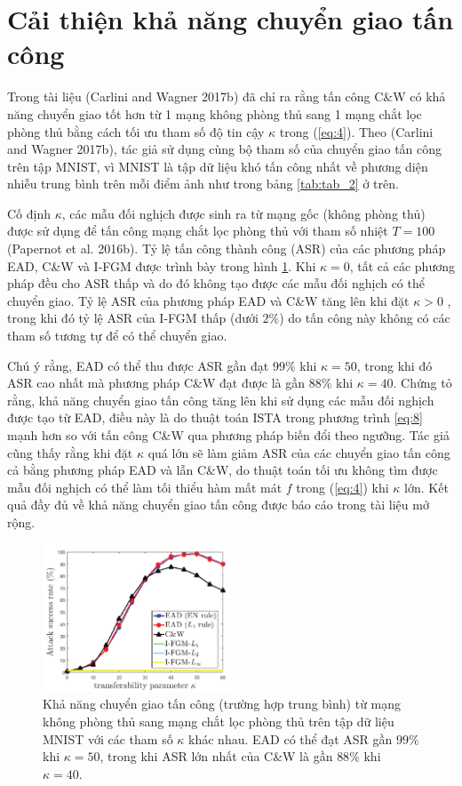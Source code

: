 \section{Cải thiện khả năng chuyển giao tấn công}
Trong tài liệu (Carlini and Wagner 2017b) đã chỉ ra rằng tấn công C\&W có khả năng chuyển giao tốt hơn  từ 1 mạng không phòng thủ sang 1 mạng chắt lọc phòng thủ bằng cách tối ưu tham số độ tin cậy $\kappa$ trong (\ref{eq:4}). Theo (Carlini and Wagner 2017b), tác giả sử dụng cùng bộ tham số của chuyển giao tấn công trên tập MNIST, vì MNIST là tập dữ liệu khó tấn công nhất về phương diện nhiễu trung bình trên mỗi điểm ảnh như trong bảng \ref{tab:tab_2} ở trên.

Cố định $\kappa$, các mẫu đối nghịch được sinh ra từ mạng gốc (không phòng thủ) được sử dụng để tấn công mạng chắt lọc phòng thủ với tham số nhiệt $T = 100$ (Papernot et al. 2016b). Tỷ lệ tấn công thành công (ASR) của các phương pháp EAD, C\&W và I-FGM được trình bày trong hình \ref{fig:fg_04}. Khi $\kappa = 0$, tất cả các phương pháp đều cho ASR thấp và do đó không tạo được các mẫu đối nghịch có thể chuyển giao. Tỷ lệ ASR của phương pháp EAD và C\&W tăng lên khi đặt $\kappa > 0$ , trong khi đó tỷ lệ ASR của I-FGM thấp (dưới $2\%$) do tấn công này không có các tham số tương tự để có thể chuyển giao.

Chú ý rằng, EAD có thể thu được ASR gần đạt $99\%$ khi $\kappa = 50$, trong khi đó ASR cao nhất mà phương pháp C\&W đạt được là gần $88\%$ khi $\kappa = 40$. Chứng tỏ rằng, khả năng chuyển giao tấn công tăng lên khi sử dụng các mẫu đối nghịch được tạo từ EAD, điều này là do thuật toán ISTA trong phương trình \ref{eq:8} mạnh hơn so với tấn công C\&W qua phương pháp biến đổi theo ngưỡng. Tác giả cũng thấy rằng khi đặt $\kappa$ quá lớn sẽ làm giảm ASR của các chuyển giao tấn công cả bằng phương pháp EAD và lẫn C\&W, do thuật toán tối ưu không tìm được mẫu đối nghịch có thể làm tối thiểu hàm mất mát $f$ trong (\ref{eq:4}) khi $\kappa$ lớn. Kết quả đầy đủ về khả năng chuyển giao tấn công được báo cáo trong tài liệu mở rộng.

\begin{figure}[H] %
    \centering %
    \includegraphics[width=0.5\textwidth]{assets/fig_04.png} 
    \caption{Khả năng chuyển giao tấn công (trường hợp trung bình) từ mạng không phòng thủ sang mạng chắt lọc phòng thủ  trên tập dữ liệu MNIST với các tham số $\kappa$ khác nhau. EAD có thể đạt ASR gần $99\%$ khi $\kappa = 50$, trong khi ASR lớn nhất của C\&W là gần $88\%$ khi $\kappa=40$.} %
    \label{fig:fg_04}
\end{figure}